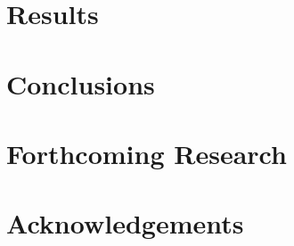 \documentclass[a0,portrait]{a0poster}
\begin{document}
\begin{multicols}{2}
	\section*{Results}



	\color{DarkRed} %

	\section*{Conclusions}


	\color{DarkSlateGray} %


	\section*{Forthcoming Research}


	\nocite{*} %


	\section*{Acknowledgements}


\end{multicols}
\end{document}
